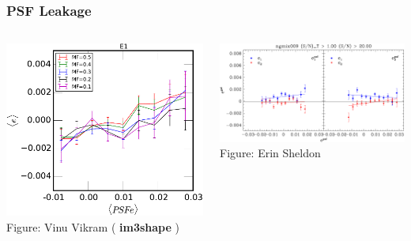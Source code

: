 \documentclass{beamer}
\newcommand{\imshape}{ {\bf im3shape} }
\begin{document}
\frame
{
    \frametitle{PSF Leakage}

    \begin{columns}
        \begin{column}{0.38\textwidth}
            \begin{center}
                \includegraphics[width=\textwidth]{im3shape-PSF-E1.pdf}
                \newline
                {\tiny Figure: Vinu Vikram (\imshape)}
            \end{center}
        \end{column}
        \begin{column}{0.62\textwidth}
            \begin{center}
            \includegraphics[width=\textwidth]{ngmix009-e-vs-epsf-Ts2n-min-1-s2n-min-20.pdf}
                \newline
                {\tiny Figure: Erin Sheldon}
            \end{center}
        \end{column}
    \end{columns}
}
\end{document}
